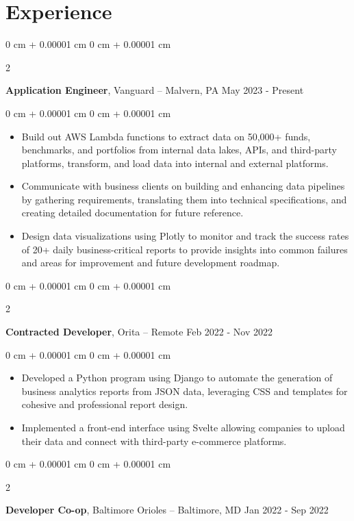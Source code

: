 \documentclass[10pt, letterpaper]{article}
\newenvironment{highlights}{
    \begin{itemize}[
        topsep=0.10 cm,
        parsep=0.10 cm,
        partopsep=0pt,
        itemsep=0pt,
        leftmargin=0 cm + 10pt
    ]
}{
    \end{itemize}
} %
\newenvironment{onecolentry}{
    \begin{adjustwidth}{
        0 cm + 0.00001 cm
    }{
        0 cm + 0.00001 cm
    }
}{
    \end{adjustwidth}
} %
\newenvironment{twocolentry}[2][]{
    \onecolentry
    \def\secondColumn{#2}
    \setcolumnwidth{\fill, 4.5 cm}
    \begin{paracol}{2}
}{
    \switchcolumn \raggedleft \secondColumn
    \end{paracol}
    \endonecolentry
} %
\begin{document}
    \section{Experience}
    \begin{twocolentry}{
        May 2023 - Present
    }
    \textbf{Application Engineer}, Vanguard -- Malvern, PA \end{twocolentry}
    \vspace{0.10 cm}
    \begin{onecolentry}
      \begin{highlights}
        \item Build out AWS Lambda functions to extract data on 50,000+ funds, benchmarks, and portfolios from internal data lakes, APIs, and third-party platforms, transform, and load data into internal and external platforms.
        \item Communicate with business clients on building and enhancing data pipelines by gathering requirements, translating them into technical specifications, and creating detailed documentation for future reference.
        \item Design data visualizations using Plotly to monitor and track the success rates of 20+ daily business-critical reports to provide insights into common failures and areas for improvement and future development roadmap.
      \end{highlights}
    \end{onecolentry}
    \vspace{0.2 cm}
    \begin{twocolentry}{
        Feb 2022 - Nov 2022
    }
    \textbf{Contracted Developer}, Orita -- Remote \end{twocolentry}
    \vspace{0.10 cm}
    \begin{onecolentry}
      \begin{highlights}
        \item Developed a Python program using Django to automate the generation of business analytics reports from JSON data, leveraging CSS and templates for cohesive and professional report design.
        \item Implemented a front-end interface using Svelte allowing companies to upload their data and connect with third-party e-commerce platforms.
      \end{highlights}
    \end{onecolentry}
    \vspace{0.2 cm}
    \begin{twocolentry}{
        Jan 2022 - Sep 2022
    }
    \textbf{Developer Co-op}, Baltimore Orioles -- Baltimore, MD \end{twocolentry}
\end{document}
